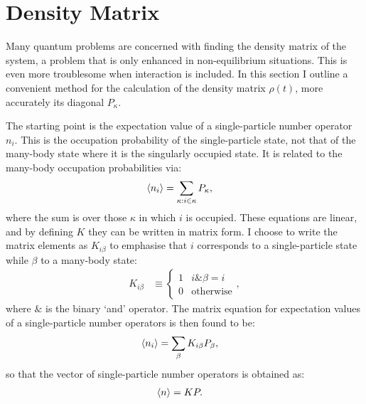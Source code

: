 \section{Density Matrix}
\label{sec:densitymatrix}
Many quantum problems are concerned with finding the density matrix of the system, a problem that is only enhanced in non-equilibrium situations. This is even more troublesome when interaction is included. In this section I outline a convenient method for the calculation of the density matrix $\rho(t)$, more accurately its diagonal $P_\kappa$.

The starting point is the expectation value of a single-particle number operator $n_i$. This is the occupation probability of the single-particle state, not that of the many-body state where it is the singularly occupied state. It is related to the many-body occupation probabilities via:
\begin{align*}
\braket{n_i} &= \sum_{\kappa: i \in \kappa} P_\kappa,
\end{align*} where the sum is over those $\kappa$ in which $i$ is occupied. These equations are linear, and by defining $K$ they can be written in matrix form. I choose to write the matrix elements as $K_{i\beta}$ to emphasise that $i$ corresponds to a single-particle state while $\beta$ to a many-body state:
\begin{align*}
K_{i\beta} &\equiv \begin{cases} 1 & i \& \beta = i\\ 0 & \text{otherwise} \end{cases},
\end{align*} where $\&$ is the binary `and' operator. The matrix equation for expectation values of a single-particle number operators is then found to be:
\begin{align*}
\braket{n_i} &= \sum_{\beta} K_{i\beta} P_\beta, 
\end{align*}
so that the vector of single-particle number operators is obtained as:
\begin{align}
\braket{n} &= K P \label{eq:nkp}.
\end{align}

